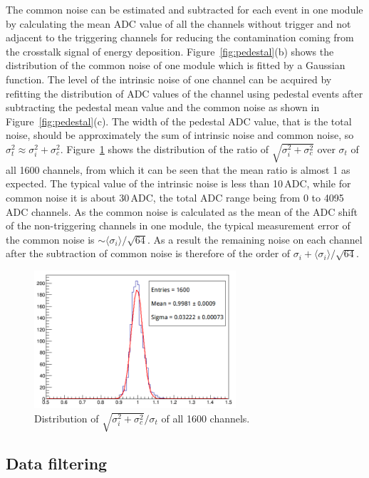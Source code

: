 \documentclass[preprint,sort&compress,12pt]{elsarticle}
\begin{document}
The common noise can be estimated and subtracted for each event in one module by calculating the mean ADC value of all the channels without trigger and not adjacent to the triggering channels for reducing the contamination coming from the crosstalk signal of energy deposition. Figure~\ref{fig:pedestal}(b) shows the distribution of the common noise of one module which is fitted by a Gaussian function. The level of the intrinsic noise of one channel can be acquired by refitting the distribution of ADC values of the channel using pedestal events after subtracting the pedestal mean value and the common noise as shown in Figure~\ref{fig:pedestal}(c). The width of the pedestal ADC value, that is the total noise, should be approximately the sum of intrinsic noise and common noise, so $\sigma_t^2 \approx \sigma_i^2 + \sigma_c^2$. Figure~\ref{fig:error_ratio} shows the distribution of the ratio of $\sqrt{\sigma_i^2+\sigma_c^2}$ over $\sigma_t$ of all 1600 channels, from which it can be seen that the mean ratio is almost 1 as expected. The typical value of the intrinsic noise is less than 10\,ADC, while for common noise it is about 30\,ADC, the total ADC range being from 0 to 4095 ADC channels. As the common noise is calculated as the mean of the ADC shift of the non-triggering channels in one module, the typical measurement error of the common noise is $\sim \langle\sigma_i\rangle/\sqrt{64}$. As a result the remaining noise on each channel after the subtraction of common noise is therefore of the order of $\sigma_i+\langle\sigma_i\rangle/\sqrt{64}$. 

\begin{figure}[!ht]
\centering
\includegraphics[width=7.5cm]{images/noise_ratio.png}
\caption{Distribution of $\sqrt{\sigma_i^2+\sigma_c^2}/\sigma_t$ of all 1600 channels.}\label{fig:error_ratio}
\end{figure}

\subsection{Data filtering}\label{sec:data_filtering}
\end{document}
